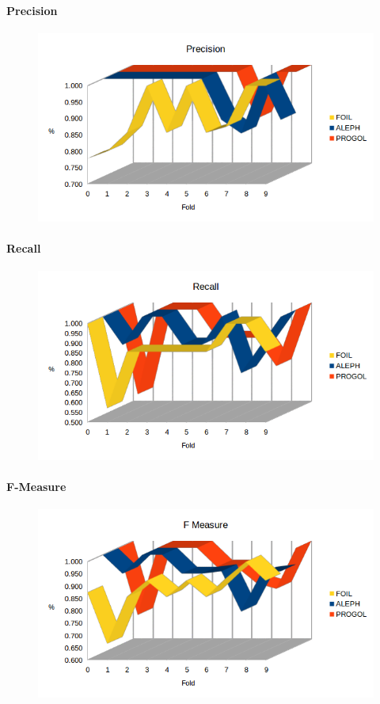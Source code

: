 \paragraph{Precision}
\begin{figure}[h!tbp]
	\includegraphics[width=1.2\textwidth]{img/datasetGraph/svln/precision.png}
	\label{svln-Precision}
\end{figure}
\paragraph{Recall}
\begin{figure}[h!tbp]
	\includegraphics[width=1.2\textwidth]{img/datasetGraph/svln/recall.png}
	\label{svln-Recall}
\end{figure}
\paragraph{F-Measure}
\begin{figure}[h!tbp]
	\includegraphics[width=1.2\textwidth]{img/datasetGraph/svln/fm.png}
	\label{svln-F-measure}
\end{figure}
